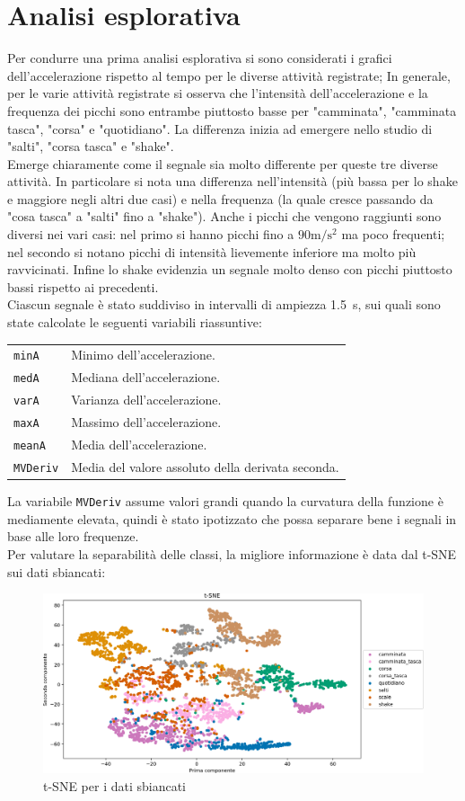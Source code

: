 \documentclass[./main.tex]{subfiles}
\begin{document}
\section{Analisi esplorativa}
 Per condurre una prima analisi esplorativa si sono considerati i grafici dell'accelerazione rispetto al tempo per le diverse attività registrate; 
In generale, per le varie attività registrate si osserva che l'intensità dell'accelerazione e la frequenza dei picchi sono entrambe piuttosto basse per "camminata", "camminata tasca", "corsa" e "quotidiano". La differenza inizia ad emergere nello studio di "salti", "corsa tasca" e "shake".\\
Emerge chiaramente come il segnale sia molto differente per queste tre diverse attività. In particolare si nota
una differenza nell'intensità (più bassa per lo shake e maggiore negli altri due casi) e nella frequenza (la quale cresce passando da "cosa tasca" a "salti" fino a "shake"). Anche i picchi che vengono raggiunti sono diversi nei vari casi: nel primo si hanno picchi fino a $90\si{\metre\per\square\second}$ ma poco frequenti; nel secondo si notano picchi di intensità lievemente inferiore ma molto più ravvicinati. Infine lo shake evidenzia un segnale molto denso con  picchi piuttosto bassi rispetto ai precedenti.\\
Ciascun segnale è stato suddiviso in intervalli di ampiezza \SI{1.5}{s}, sui quali sono state calcolate le seguenti variabili riassuntive:
\begin{table}[H]
	\begin{tabular}{ll}
		\texttt{minA}& Minimo dell'accelerazione.\\
		\texttt{medA}& Mediana dell'accelerazione.\\
		\texttt{varA}& Varianza dell'accelerazione.\\
		\texttt{maxA}& Massimo dell'accelerazione.\\
		\texttt{meanA}& Media dell'accelerazione.\\
		\texttt{MVDeriv}& Media del valore assoluto della derivata seconda.
	\end{tabular}
\end{table}
La variabile \texttt{MVDeriv} assume valori grandi quando la curvatura della funzione è mediamente elevata, quindi è stato ipotizzato che possa separare bene i segnali in base alle loro frequenze.\\
Per valutare la separabilità delle classi, la migliore informazione è data dal t-SNE sui dati sbiancati:
\begin{figure}[H]
	\centering
	\includegraphics[width=.8\textwidth]{../../figure/t-SNE.png}
	\caption{{ t-SNE per i dati sbiancati}}
	\label{t-sne}
\end{figure}
\end{document}
